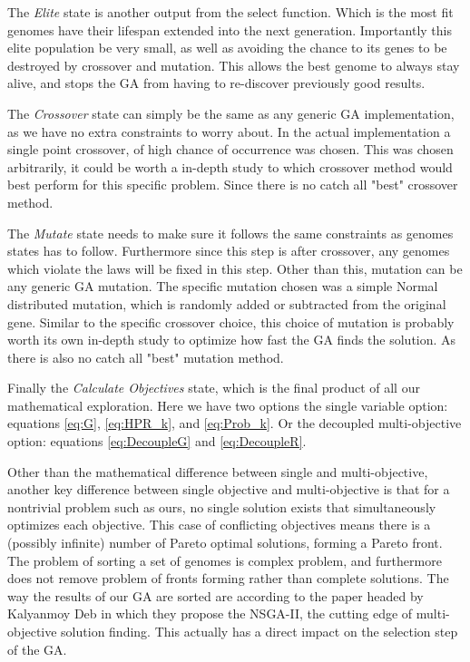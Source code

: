 \documentclass[11pt]{article}
\begin{document}
    The \textit{Elite} state is another output from the select function. Which is
    the most fit genomes have their lifespan extended into the next generation.
    Importantly this elite population be very small, as well as avoiding the
    chance to its genes to be destroyed by crossover and mutation. \cite{DeJong}
    This allows the best genome to always stay alive, and stops the GA from
    having to re-discover previously good results.

    The \textit{Crossover} state can simply be the same as any generic GA implementation,
    as we have no extra constraints to worry about. In the actual implementation
    a single point crossover, of high chance of occurrence was chosen. This was
    chosen arbitrarily, it could be worth a in-depth study to which crossover
    method would best perform for this specific problem. Since there is no catch all
    "best" crossover method.

    The \textit{Mutate} state needs to make sure it follows the same constraints as
    genomes states has to follow. Furthermore since this step is after crossover,
    any genomes which violate the laws will be fixed in this step. Other than this,
    mutation can be any generic GA mutation. The specific mutation chosen was a
    simple Normal distributed mutation, which is randomly added or subtracted from
    the original gene. Similar to the specific crossover choice, this choice
    of mutation is probably worth its own in-depth study to optimize how fast
    the GA finds the solution. As there is also no catch all "best" mutation method.

    Finally the \textit{Calculate Objectives} state, which is the final product of all our
    mathematical exploration. Here we have two options the single variable option: equations
    \ref{eq:G}, \ref{eq:HPR_k}, and \ref{eq:Prob_k}. Or the decoupled multi-objective
    option: equations \ref{eq:DecoupleG} and \ref{eq:DecoupleR}. 

    Other than the mathematical difference between single and multi-objective,
    another key difference between single objective and multi-objective is that for a
    nontrivial problem such as ours, no single solution exists that simultaneously
    optimizes each objective. This case of conflicting objectives means there is
    a (possibly infinite) number of Pareto optimal solutions, forming a Pareto front.
    The problem of sorting a set of genomes is complex problem, and furthermore
    does not remove problem of fronts forming rather than complete solutions.
    The way the results of our GA are sorted are according to the paper headed by
    Kalyanmoy Deb \cite{DebPratapAgarwalMeyarivan} in which they propose the
    NSGA-II, the cutting edge of multi-objective solution finding. This actually
    has a direct impact on the selection step of the GA.
\end{document}
